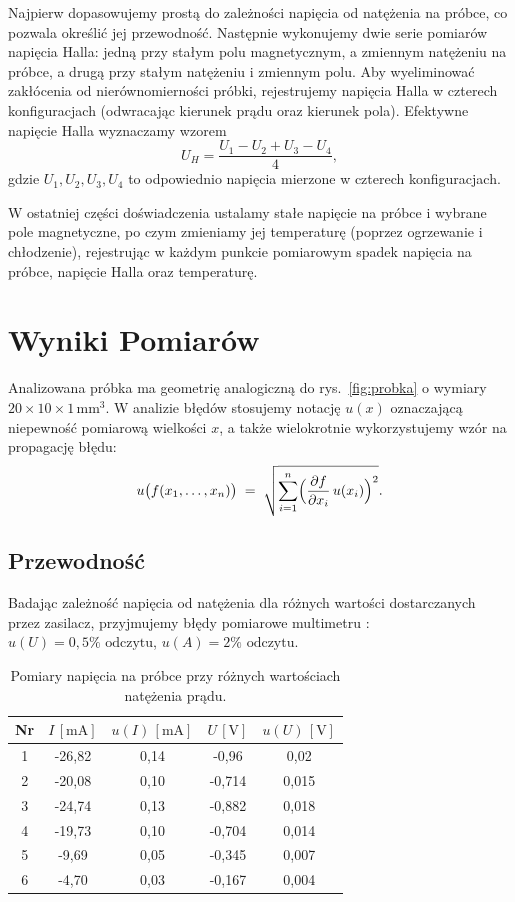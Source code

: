 \documentclass[12pt]{article}
\begin{document}
Najpierw dopasowujemy prostą do zależności napięcia od natężenia na próbce, co pozwala określić jej przewodność. Następnie wykonujemy dwie serie pomiarów napięcia Halla: jedną przy stałym polu magnetycznym, a zmiennym natężeniu na próbce, a drugą przy stałym natężeniu i zmiennym polu. Aby wyeliminować zakłócenia od nierównomierności próbki, rejestrujemy napięcia Halla w czterech konfiguracjach (odwracając kierunek prądu oraz kierunek pola). Efektywne napięcie Halla wyznaczamy wzorem
\begin{equation}
    U_H = \frac{U_1 - U_2 + U_3 - U_4}{4},
    \label{eq:effective_hall}
\end{equation}
gdzie $U_1, U_2, U_3, U_4$ to odpowiednio napięcia mierzone w czterech konfiguracjach.

W ostatniej części doświadczenia ustalamy stałe napięcie na próbce i wybrane pole magnetyczne, po czym zmieniamy jej temperaturę (poprzez ogrzewanie i chłodzenie), rejestrując w każdym punkcie pomiarowym spadek napięcia na próbce, napięcie Halla oraz temperaturę.

\section{Wyniki Pomiarów}
Analizowana próbka ma geometrię analogiczną do rys.~\ref{fig:probka} o wymiary $20 \times 10 \times 1\,\mathrm{mm}^3$. W analizie błędów stosujemy notację $u(x)$ oznaczającą niepewność pomiarową wielkości $x$, a także wielokrotnie wykorzystujemy wzór na propagację błędu:
\[
    u\bigl(f(x_1,\dots,x_n)\bigr) \;=\; \sqrt{\sum_{i=1}^{n} \Bigl(\frac{\partial f}{\partial x_i}\,u(x_i)\Bigr)^2}.
\]

\subsection{Przewodność}
Badając zależność napięcia od natężenia dla różnych wartości dostarczanych przez zasilacz, przyjmujemy błędy pomiarowe multimetru \cite{multimeter_hand}: $u(U) = 0{,}5\%\text{ odczytu}$, $u(A) = 2\%\text{ odczytu}$.

\begin{table}[h]
    \centering
    \begin{tabular}{c|cc|cc}
        \toprule
        Nr & $I\,[\mathrm{mA}]$ & $u(I)\,[\mathrm{mA}]$ & $U\,[\mathrm{V}]$ & $u(U)\,[\mathrm{V}]$ \\
        \midrule
        1 & -26{,}82 & 0{,}14 & -0{,}96 & 0{,}02 \\
        2 & -20{,}08 & 0{,}10 & -0{,}714 & 0{,}015 \\
        3 & -24{,}74 & 0{,}13 & -0{,}882 & 0{,}018 \\
        4 & -19{,}73 & 0{,}10 & -0{,}704 & 0{,}014 \\
        5 & -9{,}69  & 0{,}05 & -0{,}345 & 0{,}007 \\
        6 & -4{,}70  & 0{,}03 & -0{,}167 & 0{,}004 \\
        \bottomrule
    \end{tabular}
    \caption{Pomiary napięcia na próbce przy różnych wartościach natężenia prądu.}
    \label{tab:ohm_measurements}
\end{table}
\end{document}
